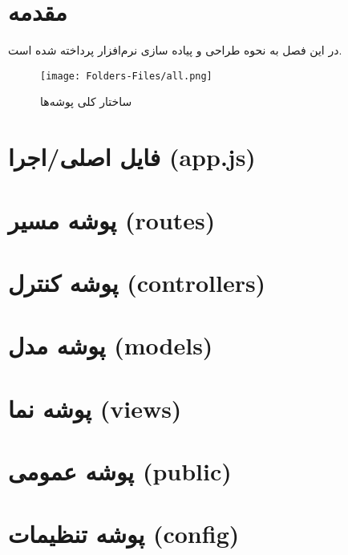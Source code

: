 


\section*{مقدمه}
در این فصل به نحوه طراحی و پیاده سازی نرم‌افزار پرداخته شده است.
\begin{figure}[H]
	\texttt{[image: Folders-Files/all.png]}
	\centering
	\caption{ساختار کلی پوشه‌ها}
	\label{fig:folder-main}
\end{figure}

\section{فایل اصلی/اجرا (app.js)}


\section{پوشه مسیر (routes)}


\section{پوشه کنترل (controllers)}


\section{پوشه مدل (models)}


\section{پوشه نما (views)}


\section{پوشه عمومی‌ (public)}


\section{پوشه تنظیمات (config)}


